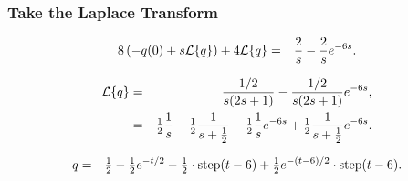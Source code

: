 \begin{frame}
  \frametitle{Take the Laplace Transform}

  \begin{eqnarray*}
    8\lp -q(0) + s \laplace{q} \rp + 4 \laplace{q} & = & \frac{2}{s} -
    \frac{2}{s} e^{-6s}.
  \end{eqnarray*}

  {
    \begin{eqnarray*}
      \laplace{q} & = & \frac{1/2}{s(2s+1)} - \frac{1/2}{s(2s+1)} e^{-6s}, \\
      & = & \half \frac{1}{s} - \half \frac{1}{s+\half}
      - \half \frac{1}{s} e^{-6s} + \half \frac{1}{s+\half} e^{-6s}.
    \end{eqnarray*}
  }

  {
    \begin{eqnarray*}
      q & = & \mbox{$\frac{1}{2}$} - \mbox{$\frac{1}{2}$} e^{-t/2} - \mbox{$\frac{1}{2}$}\cdot\mathrm{step}(t-6)
      + \mbox{$\frac{1}{2}$} e^{-(t-6)/2}\cdot\mathrm{step}(t-6).
    \end{eqnarray*}
  }


\end{frame}




